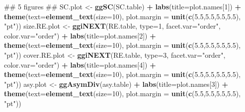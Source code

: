 \documentclass[]{article}
\newenvironment{Shaded}{\begin{snugshade}}{\end{snugshade}}
\newcommand{\KeywordTok}[1]{\textcolor[rgb]{0.13,0.29,0.53}{\textbf{#1}}}
\newcommand{\DataTypeTok}[1]{\textcolor[rgb]{0.13,0.29,0.53}{#1}}
\newcommand{\DecValTok}[1]{\textcolor[rgb]{0.00,0.00,0.81}{#1}}
\newcommand{\FloatTok}[1]{\textcolor[rgb]{0.00,0.00,0.81}{#1}}
\newcommand{\StringTok}[1]{\textcolor[rgb]{0.31,0.60,0.02}{#1}}
\newcommand{\OperatorTok}[1]{\textcolor[rgb]{0.81,0.36,0.00}{\textbf{#1}}}
\newcommand{\NormalTok}[1]{#1}
\begin{document}
\begin{Shaded}
\begin{Highlighting}[]
{\NormalTok{  ## 5 figures ##}
\NormalTok{  SC.plot <-}\StringTok{ }\KeywordTok{ggSC}\NormalTok{(SC.table) }\OperatorTok{+}
\StringTok{    }\KeywordTok{labs}\NormalTok{(}\DataTypeTok{title=}\NormalTok{plot.names[}\DecValTok{1}\NormalTok{]) }\OperatorTok{+}
\StringTok{    }\KeywordTok{theme}\NormalTok{(}\DataTypeTok{text=}\KeywordTok{element_text}\NormalTok{(}\DataTypeTok{size=}\DecValTok{10}\NormalTok{),}
          \DataTypeTok{plot.margin =} \KeywordTok{unit}\NormalTok{(}\KeywordTok{c}\NormalTok{(}\FloatTok{5.5}\NormalTok{,}\FloatTok{5.5}\NormalTok{,}\FloatTok{5.5}\NormalTok{,}\FloatTok{5.5}\NormalTok{), }\StringTok{"pt"}\NormalTok{))}
\NormalTok{  size.RE.plot <-}\StringTok{ }\KeywordTok{ggiNEXT}\NormalTok{(RE.table, }\DataTypeTok{type=}\DecValTok{1}\NormalTok{, }\DataTypeTok{facet.var=}\StringTok{"order"}\NormalTok{, }\DataTypeTok{color.var=}\StringTok{"order"}\NormalTok{) }\OperatorTok{+}
\StringTok{    }\KeywordTok{labs}\NormalTok{(}\DataTypeTok{title=}\NormalTok{plot.names[}\DecValTok{2}\NormalTok{]) }\OperatorTok{+}
\StringTok{    }\KeywordTok{theme}\NormalTok{(}\DataTypeTok{text=}\KeywordTok{element_text}\NormalTok{(}\DataTypeTok{size=}\DecValTok{10}\NormalTok{),}
          \DataTypeTok{plot.margin =} \KeywordTok{unit}\NormalTok{(}\KeywordTok{c}\NormalTok{(}\FloatTok{5.5}\NormalTok{,}\FloatTok{5.5}\NormalTok{,}\FloatTok{5.5}\NormalTok{,}\FloatTok{5.5}\NormalTok{), }\StringTok{"pt"}\NormalTok{))}
\NormalTok{  cover.RE.plot <-}\StringTok{ }\KeywordTok{ggiNEXT}\NormalTok{(RE.table, }\DataTypeTok{type=}\DecValTok{3}\NormalTok{, }\DataTypeTok{facet.var=}\StringTok{"order"}\NormalTok{, }\DataTypeTok{color.var=}\StringTok{"order"}\NormalTok{) }\OperatorTok{+}
\StringTok{    }\KeywordTok{labs}\NormalTok{(}\DataTypeTok{title=}\NormalTok{plot.names[}\DecValTok{4}\NormalTok{]) }\OperatorTok{+}
\StringTok{    }\KeywordTok{theme}\NormalTok{(}\DataTypeTok{text=}\KeywordTok{element_text}\NormalTok{(}\DataTypeTok{size=}\DecValTok{10}\NormalTok{),}
          \DataTypeTok{plot.margin =} \KeywordTok{unit}\NormalTok{(}\KeywordTok{c}\NormalTok{(}\FloatTok{5.5}\NormalTok{,}\FloatTok{5.5}\NormalTok{,}\FloatTok{5.5}\NormalTok{,}\FloatTok{5.5}\NormalTok{), }\StringTok{"pt"}\NormalTok{))}
\NormalTok{  asy.plot <-}\StringTok{ }\KeywordTok{ggAsymDiv}\NormalTok{(asy.table) }\OperatorTok{+}
\StringTok{    }\KeywordTok{labs}\NormalTok{(}\DataTypeTok{title=}\NormalTok{plot.names[}\DecValTok{3}\NormalTok{]) }\OperatorTok{+}
\StringTok{    }\KeywordTok{theme}\NormalTok{(}\DataTypeTok{text=}\KeywordTok{element_text}\NormalTok{(}\DataTypeTok{size=}\DecValTok{10}\NormalTok{),}
          \DataTypeTok{plot.margin =} \KeywordTok{unit}\NormalTok{(}\KeywordTok{c}\NormalTok{(}\FloatTok{5.5}\NormalTok{,}\FloatTok{5.5}\NormalTok{,}\FloatTok{5.5}\NormalTok{,}\FloatTok{5.5}\NormalTok{), }\StringTok{"pt"}\NormalTok{))}
}
\end{Highlighting}
\end{Shaded}
\end{document}
